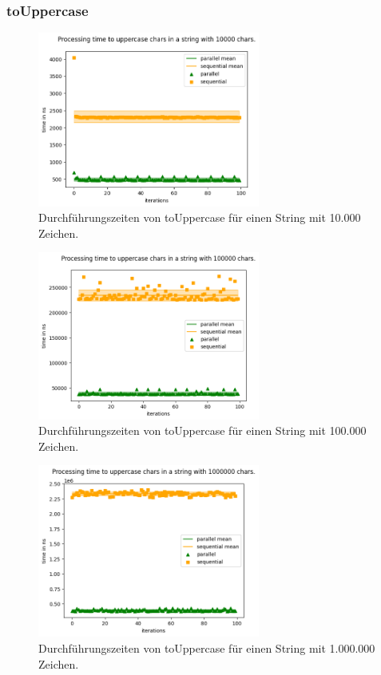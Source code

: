 \documentclass[plainarticle,zihtitle,german,final,hyperref,utf8]{zihpub}
\begin{document}
\subsubsection{toUppercase}
\begin{figure}[h]
	\begin{center}
		\includegraphics[width=0.65\textwidth]{images/comp_upper_10000.png}
		\caption{Durchführungszeiten von toUppercase für einen String mit 10.000 Zeichen.}
	\end{center}
\end{figure}
\begin{figure}[h]
\begin{center}
	\includegraphics[width=0.65\textwidth]{images/comp_upper_100000.png}
	\caption{Durchführungszeiten von toUppercase für einen String mit 100.000 Zeichen.}
\end{center}
\end{figure}
\begin{figure}[h]
\begin{center}
	\includegraphics[width=0.65\textwidth]{images/comp_upper_1000000.png}
	\caption{Durchführungszeiten von toUppercase für einen String mit 1.000.000 Zeichen.}
\end{center}
\end{figure}
\end{document}
